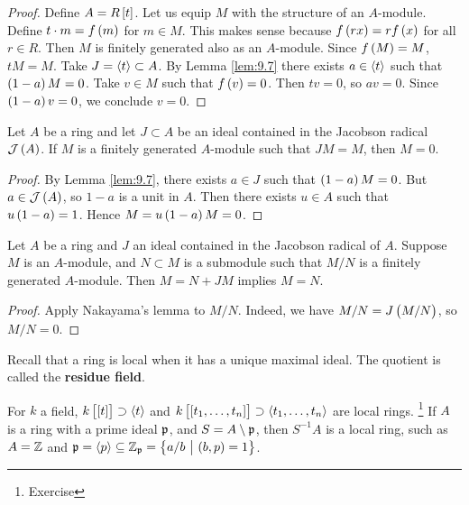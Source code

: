 \begin{proof}
Define $ A = R\sbr{t} $. Let us equip $ M $ with the structure of an $ A $-module. Define $ t \cdot m = f\br{m} $ for $ m \in M $. This makes sense because $ f\br{rx} = rf\br{x} $ for all $ r \in R $. Then $ M $ is finitely generated also as an $ A $-module. Since $ f\br{M} = M $, $ tM = M $. Take $ J = \left\langle t \right\rangle \subset A $. By Lemma \ref{lem:9.7} there exists $ a \in \left\langle t \right\rangle $ such that $ \br{1 - a}M = 0 $. Take $ v \in M $ such that $ f\br{v} = 0 $. Then $ tv = 0 $, so $ av = 0 $. Since $ \br{1 - a}v = 0 $, we conclude $ v = 0 $.
\end{proof}

\begin{theorem}
\label{thm:9.9}
Let $ A $ be a ring and let $ J \subset A $ be an ideal contained in the Jacobson radical $ \JJJ\br{A} $. If $ M $ is a finitely generated $ A $-module such that $ JM = M $, then $ M = 0 $.
\end{theorem}

\begin{proof}
By Lemma \ref{lem:9.7}, there exists $ a \in J $ such that $ \br{1 - a}M = 0 $. But $ a \in \JJJ\br{A} $, so $ 1 - a $ is a unit in $ A $. Then there exists $ u \in A $ such that $ u\br{1 - a} = 1 $. Hence $ M = u\br{1 - a}M = 0 $.
\end{proof}

\begin{corollary}
\label{cor:9.10}
Let $ A $ be a ring and $ J $ an ideal contained in the Jacobson radical of $ A $. Suppose $ M $ is an $ A $-module, and $ N \subset M $ is a submodule such that $ M / N $ is a finitely generated $ A $-module. Then $ M = N + JM $ implies $ M = N $.
\end{corollary}

\begin{proof}
Apply Nakayama's lemma to $ M / N $. Indeed, we have $ M / N = J\br{M / N} $, so $ M / N = 0 $.
\end{proof}

\pagebreak

Recall that a ring is local when it has a unique maximal ideal. The quotient is called the \textbf{residue field}.

\begin{example*}
For $ k $ a field, $ k\sbr{\sbr{t}} \supset \abr{t} $ and $ k\sbr{\sbr{t_1, \dots, t_n}} \supset \abr{t_1, \dots, t_n} $ are local rings. \footnote{Exercise} If $ A $ is a ring with a prime ideal $ \mathfrak{p} $, and $ S = A \setminus \mathfrak{p} $, then $ S^{-1}A $ is a local ring, such as $ A = \mathbb{Z} $ and $ \ppp = \abr{p} \subseteq \ZZ_\ppp = \cbr{a / b \st \br{b, p} = 1} $.
\end{example*}

